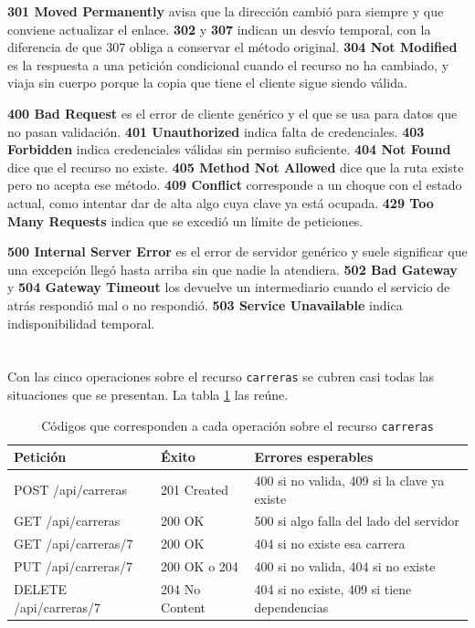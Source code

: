 \documentclass[10pt,a4paper]{article}
\begin{document}
\textbf{301 Moved Permanently} avisa que la dirección cambió para siempre y que conviene actualizar el enlace. \textbf{302} y \textbf{307} indican un desvío temporal, con la diferencia de que 307 obliga a conservar el método original. \textbf{304 Not Modified} es la respuesta a una petición condicional cuando el recurso no ha cambiado, y viaja sin cuerpo porque la copia que tiene el cliente sigue siendo válida.

\textbf{400 Bad Request} es el error de cliente genérico y el que se usa para datos que no pasan validación. \textbf{401 Unauthorized} indica falta de credenciales. \textbf{403 Forbidden} indica credenciales válidas sin permiso suficiente. \textbf{404 Not Found} dice que el recurso no existe. \textbf{405 Method Not Allowed} dice que la ruta existe pero no acepta ese método. \textbf{409 Conflict} corresponde a un choque con el estado actual, como intentar dar de alta algo cuya clave ya está ocupada. \textbf{429 Too Many Requests} indica que se excedió un límite de peticiones.

\textbf{500 Internal Server Error} es el error de servidor genérico y suele significar que una excepción llegó hasta arriba sin que nadie la atendiera. \textbf{502 Bad Gateway} y \textbf{504 Gateway Timeout} los devuelve un intermediario cuando el servicio de atrás respondió mal o no respondió. \textbf{503 Service Unavailable} indica indisponibilidad temporal.

\section{\color{colorIPN}{Qué código devolver en cada operación}}

Con las cinco operaciones sobre el recurso \texttt{carreras} se cubren casi todas las situaciones que se presentan. La tabla \ref{tabla:crud} las reúne.

\begin{table}[H]
	\centering
	\begin{tabular}{p{4.6cm} | p{2.6cm} | p{6cm}}\hline \hline
		\textbf{Petición} & \textbf{Éxito} & \textbf{Errores esperables} \\ \hline \hline
		POST /api/carreras & 201 Created & 400 si no valida, 409 si la clave ya existe \\ \hline
		GET /api/carreras & 200 OK & 500 si algo falla del lado del servidor \\ \hline
		GET /api/carreras/7 & 200 OK & 404 si no existe esa carrera \\ \hline
		PUT /api/carreras/7 & 200 OK o 204 & 400 si no valida, 404 si no existe \\ \hline
		DELETE /api/carreras/7 & 204 No Content & 404 si no existe, 409 si tiene dependencias \\ \hline \hline
	\end{tabular}
	\caption{Códigos que corresponden a cada operación sobre el recurso \texttt{carreras}}
	\label{tabla:crud}
\end{table}
\end{document}
